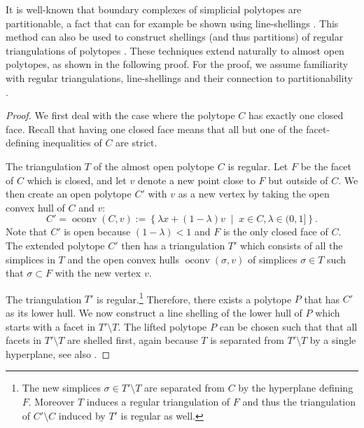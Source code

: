 \documentclass[12pt,reqno]{amsart}
\numberwithin{definition}{section}
\theoremstyle{definition}
\newcommand{\mset}[2]{ \left\{ #1 \; \middle| \; #2 \right\}}
\begin{document}
It is well-known that boundary complexes of simplicial polytopes are partitionable, a fact that can for example be shown using line-shellings \cite{Bruggesser1971}. This method can also be used to construct shellings (and thus partitions) of regular triangulations of polytopes \cite[Corollary~8.14]{Ziegler1995}. These techniques extend naturally to almost open polytopes, as shown in the following proof. For the proof, we assume familiarity with regular triangulations, line-shellings and their connection to partitionability \cite{DeLoera2010,Lee2004,Ziegler1995}.

\begin{proof} 
We first deal with the case where the polytope $C$ has exactly one closed face. Recall that having one closed face means that all but one of the facet-defining inequalities of $C$ are strict.

The triangulation $T$ of the almost open polytope $C$ is regular. Let $F$ be the facet of $C$ which is closed, and let $v$ denote a new point close to $F$ but outside of $C$. We then create an open polytope $C'$ with $v$ as a new vertex by taking the open convex hull of $C$ and $v$:
\[
  C' = \operatorname{oconv}(C,v) := \mset{\lambda x + (1-\lambda)v}{x\in C, \lambda\in (0,1] }.
\]
Note that $C'$ is open because $(1-\lambda)<1$ and $F$ is the only closed face of $C$. The extended polytope $C'$ then has a triangulation $T'$ which consists of all the simplices in $T$ and the open convex hulls $\operatorname{oconv}(\sigma,v)$ of simplices $\sigma\in T$ such that $\sigma\subset F$ with the new vertex $v$. 

The triangulation $T'$ is regular.\footnote{The new simplices $\sigma\in T'\setminus T$ are separated from $C$ by the hyperplane defining $F$. Moreover $T$ induces a regular triangulation of $F$ and thus the triangulation of $C'\setminus C$ induced by $T'$ is regular as well.} Therefore, there exists a polytope $P$ that has $C'$ as its lower hull. We now construct a line shelling of the lower hull of $P$ which starts with a facet in $T'\setminus T$. The lifted polytope $P$ can be chosen such that that all facets in $T'\setminus T$ are shelled first, again because $T$ is separated from $T'\setminus T$ by a single hyperplane, see also \cite[Lemma~2]{Breuer2011}.


\end{proof}
\end{document}
